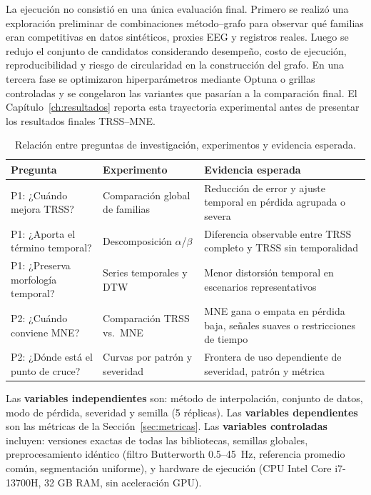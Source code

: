 La ejecución no consistió en una única evaluación final. Primero se realizó una exploración preliminar de combinaciones método--grafo para observar qué familias eran competitivas en datos sintéticos, proxies EEG y registros reales. Luego se redujo el conjunto de candidatos considerando desempeño, costo de ejecución, reproducibilidad y riesgo de circularidad en la construcción del grafo. En una tercera fase se optimizaron hiperparámetros mediante Optuna o grillas controladas y se congelaron las variantes que pasarían a la comparación final. El Capítulo~\ref{ch:resultados} reporta esta trayectoria experimental antes de presentar los resultados finales TRSS--MNE.
\begin{table}[htbp]
\centering
\caption{Relación entre preguntas de investigación, experimentos y evidencia esperada.}
\label{tab:research_questions_experiments}
\small
\begin{tabular}{@{}p{3.2cm} p{3.0cm} p{5.5cm}@{}}
\toprule
Pregunta & Experimento & Evidencia esperada \\
\midrule
P1: ¿Cuándo mejora TRSS? & Comparación global de familias & Reducción de error y ajuste temporal en pérdida agrupada o severa \\
P1: ¿Aporta el término temporal? & Descomposición $\alpha$/$\beta$ & Diferencia observable entre TRSS completo y TRSS sin temporalidad \\
P1: ¿Preserva morfología temporal? & Series temporales y DTW & Menor distorsión temporal en escenarios representativos \\
P2: ¿Cuándo conviene MNE? & Comparación TRSS vs.\ MNE & MNE gana o empata en pérdida baja, señales suaves o restricciones de tiempo \\
P2: ¿Dónde está el punto de cruce? & Curvas por patrón y severidad & Frontera de uso dependiente de severidad, patrón y métrica \\
\bottomrule
\end{tabular}
\end{table}

Las \textbf{variables independientes} son: método de interpolación, conjunto de datos, modo de pérdida, severidad y semilla (5 réplicas). Las \textbf{variables dependientes} son las métricas de la Sección~\ref{sec:metricas}. Las \textbf{variables controladas} incluyen: versiones exactas de todas las bibliotecas, semillas globales, preprocesamiento idéntico (filtro Butterworth 0.5--45~Hz, referencia promedio común, segmentación uniforme), y hardware de ejecución (CPU Intel Core i7-13700H, 32 GB RAM, sin aceleración GPU).

